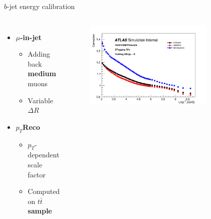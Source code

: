 \begin{frame}{$b$-jet energy calibration}
\begin{columns}
\begin{itemize}
    \item \textcolor{HHred}{\textbf{$\mu$-in-jet}}
    \begin{itemize}
        \item Adding back \textbf{medium} muons
        \item Variable $\Delta R$ 
    \end{itemize}
    \item \textcolor{HHturquoise_d}{\textbf{$p_T$Reco}}
    \begin{itemize}
        \item $p_T$-dependent scale factor
        \item Computed on \textbf{$t\bar{t}$ sample}
    \end{itemize}
\end{itemize}
\begin{figure}
    \centering
    \includegraphics[width=0.8\textwidth]{Part3/Img/ptrecopflow.png}
\end{figure}


\end{columns}
\end{frame}
